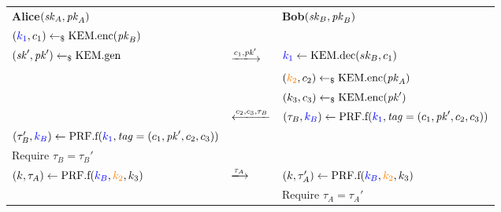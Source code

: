 \begin{tabular}{lC{3cm}l}
    \textbf{Alice}$(\mathit{sk}_A, \mathit{pk}_A)$ & & \textbf{Bob}$(\mathit{sk}_B, \mathit{pk}_B)$\\
    $({\color{blue}k_1},c_1)\gets_\$\mathrm{KEM}.\mathrm{enc}(\mathit{pk}_B)$ & &\\
    $(\mathit{sk}',\mathit{pk}')\gets_\$\mathrm{KEM}.\mathrm{gen}$ & $\xlongrightarrow{c_1,\pk'}$ & ${\color{blue}k_1}\gets\mathrm{KEM}.\mathrm{dec}(sk_B,c_1)$ \\
    & & $({\color{orange}k_2},c_2)\gets_\$\mathrm{KEM}.\mathrm{enc}(\mathit{pk}_A)$\\
    & & $(k_3,c_3)\gets_\$\mathrm{KEM}.\mathrm{enc}(\mathit{pk}')$\\
    & $\xlongleftarrow{c_2,c_3,\tau_B}$ & $(\tau_B, {\color{blue}k_B})\gets\mathrm{PRF}.\mathrm{f}({\color{blue}k_1},\mathit{tag}=(c_1,\mathit{pk}',c_2,c_3))$\\
    $(\tau_B', {\color{blue}k_B})\gets\mathrm{PRF}.\mathrm{f}({\color{blue}k_1},\mathit{tag}=(c_1,\mathit{pk}',c_2,c_3))$ & &\\
    Require $\tau_B=\tau_B'$ & &\\
    $(k,\tau_A)\gets\mathrm{PRF}.\mathrm{f}({\color{blue}k_B},{\color{orange}k_2},k_3)$ & $\xlongrightarrow{\tau_A}$ & $(k,\tau_A')\gets\mathrm{PRF}.\mathrm{f}({\color{blue}k_B},{\color{orange}k_2},k_3)$\\
    & & Require $\tau_A=\tau_A'$\\
\end{tabular}